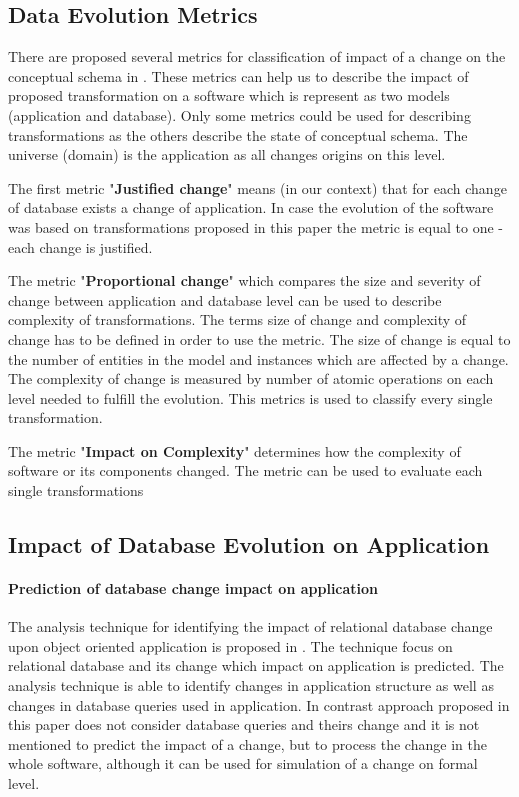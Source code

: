 \documentclass[11pt]{article}
\begin{document}
\subsection{Data Evolution Metrics}
There are proposed several metrics for classification of impact of a change on the conceptual schema in \cite{Wedemeijer:ConceptualMetrics}. These metrics can help us to describe the impact of proposed transformation on a software which is represent as two models (application and database). Only some metrics could be used for describing transformations as the others describe the state of conceptual schema. The universe (domain) is the application as all changes origins on this level.

The first metric "\textbf{Justified change}" means (in our context) that for each change of database exists a change of application. In case the evolution of the software was based on transformations proposed in this paper the metric is equal to one - each change is justified.

The metric "\textbf{Proportional change}" which compares the size and severity of change between application and database level can be used to describe complexity of transformations. The terms size of change and complexity of change has to be defined in order to use the metric. The size of change is equal to the number of entities in the model and instances which are affected by a change. The complexity of change is measured by number of atomic operations on each level needed to fulfill the evolution. This metrics is used to classify every single transformation.

The metric "\textbf{Impact on Complexity}" determines how the complexity of software or its components  changed. The metric can be used to evaluate each single transformations

\subsection{Impact of Database Evolution on Application}
\paragraph{Prediction of database change impact on application}The analysis technique for identifying the impact of relational database change upon object oriented application is proposed in \cite{Maule:ImpactAnalysis}. The technique focus on relational database and its change which impact on application is predicted. The analysis technique is able to identify changes in application structure as well as changes in database queries used in application. In contrast approach proposed in this paper does not consider database queries and theirs change and it is not mentioned to predict the impact of a change, but to  
process the change in the whole software, although it can be used for simulation of a change on formal level.



\end{document}
